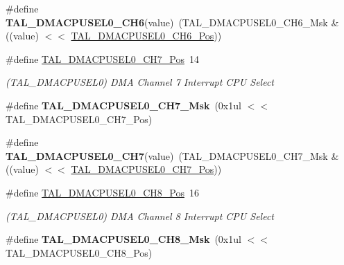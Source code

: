 \begin{DoxyCompactItemize}
\item 
\hypertarget{group___s_a_m_l21___t_a_l_ga41590193e8b785510cc03281441be8ec}{}\#define {\bfseries T\+A\+L\+\_\+\+D\+M\+A\+C\+P\+U\+S\+E\+L0\+\_\+\+C\+H6}(value)~(T\+A\+L\+\_\+\+D\+M\+A\+C\+P\+U\+S\+E\+L0\+\_\+\+C\+H6\+\_\+\+Msk \& ((value) $<$$<$ \hyperlink{group___s_a_m_l21___t_a_l_ga2d76e9c7a8321e8cb4babd7b00950371}{T\+A\+L\+\_\+\+D\+M\+A\+C\+P\+U\+S\+E\+L0\+\_\+\+C\+H6\+\_\+\+Pos}))\label{group___s_a_m_l21___t_a_l_ga41590193e8b785510cc03281441be8ec}

\item 
\hypertarget{group___s_a_m_l21___t_a_l_gaa1e1d102656e58041cb5a99a5dd4dcfa}{}\#define \hyperlink{group___s_a_m_l21___t_a_l_gaa1e1d102656e58041cb5a99a5dd4dcfa}{T\+A\+L\+\_\+\+D\+M\+A\+C\+P\+U\+S\+E\+L0\+\_\+\+C\+H7\+\_\+\+Pos}~14\label{group___s_a_m_l21___t_a_l_gaa1e1d102656e58041cb5a99a5dd4dcfa}

\begin{DoxyCompactList}\small\item\em (T\+A\+L\+\_\+\+D\+M\+A\+C\+P\+U\+S\+E\+L0) D\+M\+A Channel 7 Interrupt C\+P\+U Select \end{DoxyCompactList}\item 
\hypertarget{group___s_a_m_l21___t_a_l_gadfcbf417d1c332c0805bcd3da0e25c4d}{}\#define {\bfseries T\+A\+L\+\_\+\+D\+M\+A\+C\+P\+U\+S\+E\+L0\+\_\+\+C\+H7\+\_\+\+Msk}~(0x1ul $<$$<$ T\+A\+L\+\_\+\+D\+M\+A\+C\+P\+U\+S\+E\+L0\+\_\+\+C\+H7\+\_\+\+Pos)\label{group___s_a_m_l21___t_a_l_gadfcbf417d1c332c0805bcd3da0e25c4d}

\item 
\hypertarget{group___s_a_m_l21___t_a_l_gac6451c4a59ff24290b5486bc7826b4b8}{}\#define {\bfseries T\+A\+L\+\_\+\+D\+M\+A\+C\+P\+U\+S\+E\+L0\+\_\+\+C\+H7}(value)~(T\+A\+L\+\_\+\+D\+M\+A\+C\+P\+U\+S\+E\+L0\+\_\+\+C\+H7\+\_\+\+Msk \& ((value) $<$$<$ \hyperlink{group___s_a_m_l21___t_a_l_gaa1e1d102656e58041cb5a99a5dd4dcfa}{T\+A\+L\+\_\+\+D\+M\+A\+C\+P\+U\+S\+E\+L0\+\_\+\+C\+H7\+\_\+\+Pos}))\label{group___s_a_m_l21___t_a_l_gac6451c4a59ff24290b5486bc7826b4b8}

\item 
\hypertarget{group___s_a_m_l21___t_a_l_ga0370e61be98e11df89372599deb71bdd}{}\#define \hyperlink{group___s_a_m_l21___t_a_l_ga0370e61be98e11df89372599deb71bdd}{T\+A\+L\+\_\+\+D\+M\+A\+C\+P\+U\+S\+E\+L0\+\_\+\+C\+H8\+\_\+\+Pos}~16\label{group___s_a_m_l21___t_a_l_ga0370e61be98e11df89372599deb71bdd}

\begin{DoxyCompactList}\small\item\em (T\+A\+L\+\_\+\+D\+M\+A\+C\+P\+U\+S\+E\+L0) D\+M\+A Channel 8 Interrupt C\+P\+U Select \end{DoxyCompactList}\item 
\hypertarget{group___s_a_m_l21___t_a_l_ga0c6ba78b65f2fbf5ea60bb032d43e2c5}{}\#define {\bfseries T\+A\+L\+\_\+\+D\+M\+A\+C\+P\+U\+S\+E\+L0\+\_\+\+C\+H8\+\_\+\+Msk}~(0x1ul $<$$<$ T\+A\+L\+\_\+\+D\+M\+A\+C\+P\+U\+S\+E\+L0\+\_\+\+C\+H8\+\_\+\+Pos)\label{group___s_a_m_l21___t_a_l_ga0c6ba78b65f2fbf5ea60bb032d43e2c5}


\end{DoxyCompactItemize}
